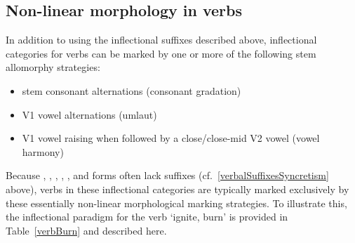 \subsection{Non-linear morphology in verbs}\label{nonLinearMorphVerbs}
In addition to using the inflectional suffixes described above, inflectional categories for verbs can be marked %
by one or more of the following stem allomorphy strategies: %
\begin{itemize}
\item{stem consonant alternations (consonant gradation)}
\item{V1 vowel alternations (umlaut)}
\item{V1 vowel raising when followed by a close/close-mid V2 vowel (vowel harmony)}
\end{itemize}
Because , , , , ,  and  forms often lack suffixes (cf.~\SEC\ref{verbalSuffixesSyncretism} above), verbs in these inflectional categories are typically marked exclusively by these essentially non-linear morphological marking strategies. 
To illustrate this, the inflectional paradigm for the verb  ‘ignite, burn’ is provided in Table~\vref{verbBurn} and described here. 

